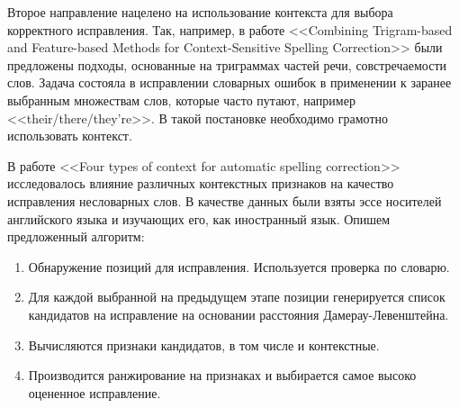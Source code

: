 Второе направление нацелено на использование контекста для выбора корректного исправления.  Так, например, в работе <<Combining Trigram-based and Feature-based Methods for Context-Sensitive Spelling Correction>> \cite{Golding1996} были предложены подходы, основанные на триграммах частей речи, совстречаемости слов. Задача состояла в исправлении словарных ошибок в применении к заранее выбранным множествам слов, которые часто путают, например <<their/there/they're>>. В такой постановке необходимо грамотно использовать контекст. 

В работе <<Four types of context for automatic spelling correction>> \cite{Flor2012} исследовалось влияние различных контекстных признаков на качество исправления несловарных слов. В качестве данных были взяты эссе носителей английского языка и изучающих его, как иностранный язык. Опишем предложенный алгоритм:
\begin{enumerate}
	\item Обнаружение позиций для исправления. Используется проверка по словарю.
	\item Для каждой выбранной на предыдущем этапе позиции генерируется список кандидатов на исправление на основании расстояния Дамерау-Левенштейна. 
	\item Вычисляются признаки кандидатов, в том числе и контекстные.
	\item Производится ранжирование на признаках и выбирается самое высоко оцененное исправление.
\end{enumerate}

